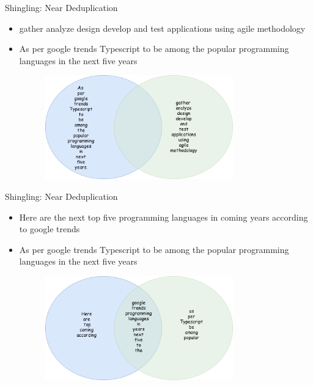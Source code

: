 \documentclass[9pt]{beamer}
\begin{document}
\begin{frame}{Shingling: Near Deduplication}
  \begin{itemize}
  \item gather analyze design develop and test applications using agile methodology
  \item As per google trends Typescript to be among the popular programming languages in the next five years
  \end{itemize}
  \pause
  \begin{figure}
    \includegraphics[width=9.5cm,height=4.5cm]{img/bagofwordsintersect.png}
  \end{figure}
\end{frame}


\begin{frame}{Shingling: Near Deduplication}
  \begin{itemize}
  \item Here are the next top five programming languages in coming years according to google trends
  \item As per google trends Typescript to be among the popular programming languages in the next five years
  \end{itemize}
  \pause
  \begin{figure}
    \includegraphics[width=9.5cm,height=4.5cm]{img/bagofwordsintersect2.png}
  \end{figure}
\end{frame}

\end{document}
